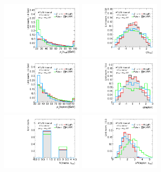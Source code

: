 

\begin{figure}[tp]
  \centering
  \includegraphics[width=0.35\textwidth]{figures/overlaid/vbf/tau-pt}
  \includegraphics[width=0.35\textwidth]{figures/overlaid/vbf/tau-eta}
  \includegraphics[width=0.35\textwidth]{figures/overlaid/vbf/lep-pt-hi}
  \includegraphics[width=0.35\textwidth]{figures/overlaid/vbf/lep-eta}
  \includegraphics[width=0.35\textwidth]{figures/overlaid/vbf/tau-numTrack}
  \includegraphics[width=0.35\textwidth]{figures/overlaid/vbf/taulep-dR}

\end{figure}
